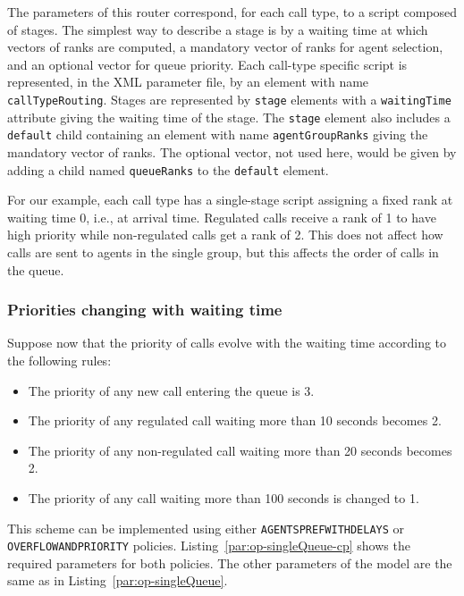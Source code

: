 The parameters of this router correspond, for each call type, to a
script composed of stages.  The simplest way to describe a stage is
by a waiting time at which vectors of ranks are computed,
a mandatory vector of ranks for agent selection, and
an optional vector for queue priority.
Each call-type specific script is represented, in the XML parameter
file, by an element with name \texttt{call\-Type\-Routing}.
Stages are represented by \texttt{stage} elements with a
\texttt{waiting\-Time} attribute giving the waiting time of the stage.
The \texttt{stage} element also includes
a \texttt{default} child containing an element with name
\texttt{agent\-Group\-Ranks} giving the mandatory vector of ranks.
The optional vector, not used here, would be given by
adding a child named \texttt{queue\-Ranks} to the \texttt{default}
element.

For our example, each call type has a single-stage script assigning
a fixed rank
at waiting time 0, i.e., at arrival time.  Regulated
calls receive a rank of 1 to have high priority while non-regulated
calls get a rank of 2. This does not affect how calls are sent to
agents in the single group, but this affects the order of calls in the
queue.

\subsubsection{Priorities changing with waiting time}

Suppose now that the priority of calls evolve with the waiting time
according to the following rules:
\begin{itemize}
\item The priority of any new call entering the queue is 3.
\item The priority of any regulated call waiting more than 10 seconds
  becomes 2.
\item The priority of any non-regulated call waiting more than 20 seconds becomes
  2.
\item The priority of any call waiting more than 100 seconds is
  changed to 1.
\end{itemize}

This scheme can be implemented using either
\texttt{AGENTSPREFWITHDELAYS} or \texttt{OVERFLOW\-AND\-PRIORITY}
policies.
Listing~\ref{par:op-singleQueue-cp} shows the required parameters for
both policies. The other parameters of the model are the same as in
Listing~\ref{par:op-singleQueue}.

